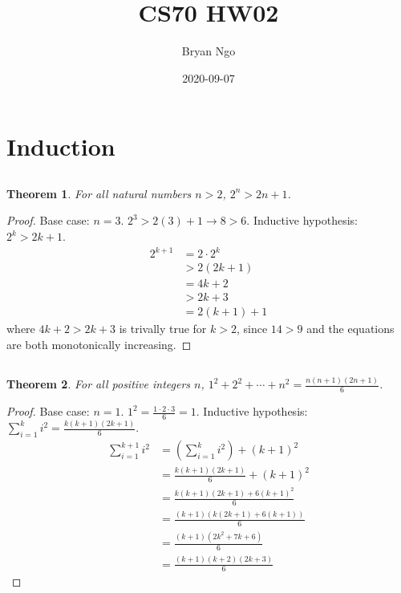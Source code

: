 \documentclass{article}
\title{CS70 HW02}
\author{Bryan Ngo}
\date{2020-09-07}
\newtheorem{theorem}{Theorem}
\begin{document}
\maketitle

\section{Induction}

\subsection{}

\begin{theorem}
    For all natural numbers \(n > 2\), \(2^n > 2n + 1\).
\end{theorem}
\begin{proof}
    Base case: \(n = 3\). \(2^3 > 2(3) + 1 \to 8 > 6\).
    Inductive hypothesis: \(2^k > 2k + 1\).
    \begin{align}
        2^{k + 1} &= 2 \cdot 2^k \\
        &> 2 (2k + 1) \\
        &= 4k + 2 \\
        &> 2k + 3 \\
        &= 2(k + 1) + 1
    \end{align}
    where \(4k + 2 > 2k + 3\) is trivally true for \(k > 2\), since \(14 > 9\) and the equations are both monotonically increasing.
\end{proof}

\subsection{}

\begin{theorem}
    For all positive integers \(n\), \(1^2 + 2^2 + \cdots + n^2 = \frac{n (n + 1) (2n + 1)}{6}\).
\end{theorem}
\begin{proof}
    Base case: \(n = 1\). \(1^2 = \frac{1 \cdot 2 \cdot 3}{6} = 1\).
    Inductive hypothesis: \(\sum_{i = 1}^k i^2 = \frac{k (k + 1) (2k + 1)}{6}\).
    \begin{align}
        \sum_{i = 1}^{k + 1} i^2 &= \left(\sum_{i = 1}^k i^2\right) + (k + 1)^2 \\
        &= \frac{k (k + 1) (2k + 1)}{6} + (k + 1)^2 \\
        &= \frac{k (k + 1) (2k + 1) + 6(k + 1)^2}{6} \\
        &= \frac{(k + 1) (k (2k + 1) + 6(k + 1))}{6} \\
        &= \frac{(k + 1) (2k^2 + 7k + 6)}{6} \\
        &= \frac{(k + 1) (k + 2) (2k + 3)}{6}
    \end{align}
\end{proof}
\end{document}
